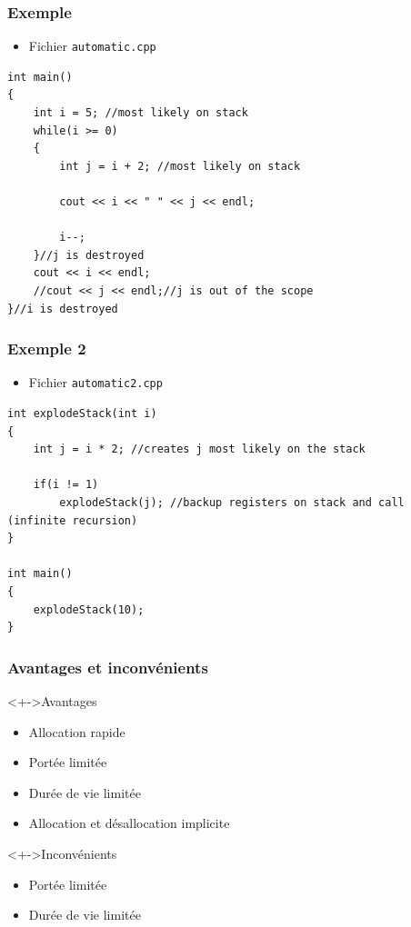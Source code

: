 \begin{frame}[containsverbatim]
\frametitle{Exemple}
\begin{itemize}
\item Fichier \texttt{automatic.cpp}
\end{itemize}
\begin{lstlisting}
int main()
{
	int i = 5; //most likely on stack
	while(i >= 0)
	{
		int j = i + 2; //most likely on stack
		
		cout << i << " " << j << endl;

		i--;
	}//j is destroyed
	cout << i << endl;
	//cout << j << endl;//j is out of the scope
}//i is destroyed
\end{lstlisting}
\end{frame}

\begin{frame}[containsverbatim]
\frametitle{Exemple 2}
\begin{itemize}
\item Fichier \texttt{automatic2.cpp}
\end{itemize}
\begin{lstlisting}
int explodeStack(int i)
{	
	int j = i * 2; //creates j most likely on the stack

	if(i != 1)
		explodeStack(j); //backup registers on stack and call (infinite recursion)
}

int main()
{
	explodeStack(10);
}
\end{lstlisting}
\end{frame}

\begin{frame}
\frametitle{Avantages et inconvénients}
\begin{block}<+->{Avantages}
	\begin{itemize}[<+->]
	\item Allocation rapide
	\item Portée limitée
	\item Durée de vie limitée
	\item Allocation et désallocation implicite
	\end{itemize}
\end{block}
\begin{alertblock}<+->{Inconvénients}
	\begin{itemize}[<+->]
	\item Portée limitée		
	\item Durée de vie limitée	
	\end{itemize}
\end{alertblock}
\end{frame}

